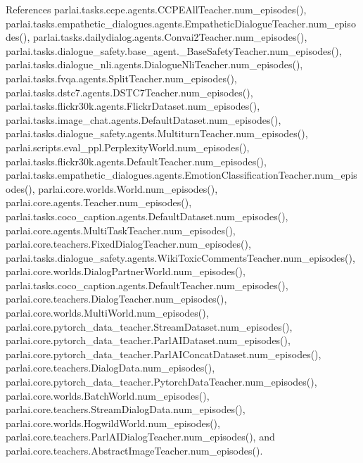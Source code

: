 References parlai.\+tasks.\+ccpe.\+agents.\+C\+C\+P\+E\+All\+Teacher.\+num\+\_\+episodes(), parlai.\+tasks.\+empathetic\+\_\+dialogues.\+agents.\+Empathetic\+Dialogue\+Teacher.\+num\+\_\+episodes(), parlai.\+tasks.\+dailydialog.\+agents.\+Convai2\+Teacher.\+num\+\_\+episodes(), parlai.\+tasks.\+dialogue\+\_\+safety.\+base\+\_\+agent.\+\_\+\+Base\+Safety\+Teacher.\+num\+\_\+episodes(), parlai.\+tasks.\+dialogue\+\_\+nli.\+agents.\+Dialogue\+Nli\+Teacher.\+num\+\_\+episodes(), parlai.\+tasks.\+fvqa.\+agents.\+Split\+Teacher.\+num\+\_\+episodes(), parlai.\+tasks.\+dstc7.\+agents.\+D\+S\+T\+C7\+Teacher.\+num\+\_\+episodes(), parlai.\+tasks.\+flickr30k.\+agents.\+Flickr\+Dataset.\+num\+\_\+episodes(), parlai.\+tasks.\+image\+\_\+chat.\+agents.\+Default\+Dataset.\+num\+\_\+episodes(), parlai.\+tasks.\+dialogue\+\_\+safety.\+agents.\+Multiturn\+Teacher.\+num\+\_\+episodes(), parlai.\+scripts.\+eval\+\_\+ppl.\+Perplexity\+World.\+num\+\_\+episodes(), parlai.\+tasks.\+flickr30k.\+agents.\+Default\+Teacher.\+num\+\_\+episodes(), parlai.\+tasks.\+empathetic\+\_\+dialogues.\+agents.\+Emotion\+Classification\+Teacher.\+num\+\_\+episodes(), parlai.\+core.\+worlds.\+World.\+num\+\_\+episodes(), parlai.\+core.\+agents.\+Teacher.\+num\+\_\+episodes(), parlai.\+tasks.\+coco\+\_\+caption.\+agents.\+Default\+Dataset.\+num\+\_\+episodes(), parlai.\+core.\+agents.\+Multi\+Task\+Teacher.\+num\+\_\+episodes(), parlai.\+core.\+teachers.\+Fixed\+Dialog\+Teacher.\+num\+\_\+episodes(), parlai.\+tasks.\+dialogue\+\_\+safety.\+agents.\+Wiki\+Toxic\+Comments\+Teacher.\+num\+\_\+episodes(), parlai.\+core.\+worlds.\+Dialog\+Partner\+World.\+num\+\_\+episodes(), parlai.\+tasks.\+coco\+\_\+caption.\+agents.\+Default\+Teacher.\+num\+\_\+episodes(), parlai.\+core.\+teachers.\+Dialog\+Teacher.\+num\+\_\+episodes(), parlai.\+core.\+worlds.\+Multi\+World.\+num\+\_\+episodes(), parlai.\+core.\+pytorch\+\_\+data\+\_\+teacher.\+Stream\+Dataset.\+num\+\_\+episodes(), parlai.\+core.\+pytorch\+\_\+data\+\_\+teacher.\+Parl\+A\+I\+Dataset.\+num\+\_\+episodes(), parlai.\+core.\+pytorch\+\_\+data\+\_\+teacher.\+Parl\+A\+I\+Concat\+Dataset.\+num\+\_\+episodes(), parlai.\+core.\+teachers.\+Dialog\+Data.\+num\+\_\+episodes(), parlai.\+core.\+pytorch\+\_\+data\+\_\+teacher.\+Pytorch\+Data\+Teacher.\+num\+\_\+episodes(), parlai.\+core.\+worlds.\+Batch\+World.\+num\+\_\+episodes(), parlai.\+core.\+teachers.\+Stream\+Dialog\+Data.\+num\+\_\+episodes(), parlai.\+core.\+worlds.\+Hogwild\+World.\+num\+\_\+episodes(), parlai.\+core.\+teachers.\+Parl\+A\+I\+Dialog\+Teacher.\+num\+\_\+episodes(), and parlai.\+core.\+teachers.\+Abstract\+Image\+Teacher.\+num\+\_\+episodes().

